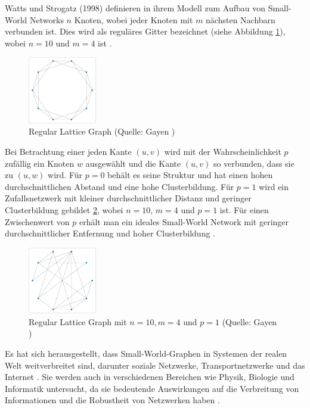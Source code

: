 Watts und Strogatz (1998) definieren in ihrem Modell zum Aufbau von Small-World Networks $n$ Knoten, wobei jeder Knoten mit $m$ nächsten Nachbarn verbunden ist.
Dies wird als reguläres Gitter bezeichnet (siehe Abbildung \ref{fig:small_world}), wobei $n = 10$ und $m = 4$ ist  \cite{gayen_small_2020}.
\begin{figure}[H]
    \centering
    \includegraphics[width=3cm]{images/20_material_methods/small_world_lattice.png}
    \caption{Regular Lattice Graph (Quelle: Gayen \cite{gayen_small_2020})}
    \label{fig:small_world}
\end{figure}
Bei Betrachtung einer jeden Kante $(u, v)$ wird mit der Wahrscheinlichkeit $p$ zufällig ein Knoten $w$ ausgewählt und die Kante $(u, v)$ so verbunden, dass sie zu $(u, w)$ wird.
Für $p = 0$ behält es seine Struktur und hat einen hohen durchschnittlichen Abstand und eine hohe Clusterbildung.
Für $p = 1$ wird ein Zufallsnetzwerk mit kleiner durchschnittlicher Distanz und geringer Clusterbildung gebildet \ref{fig:small_world_lattice_n10}, wobei $n = 10$, $m = 4$ und $p = 1$ ist.
Für einen Zwischenwert von $p$ erhält man ein ideales Small-World Network mit geringer durchschnittlicher Entfernung und hoher Clusterbildung \cite{gayen_small_2020}.
\begin{figure}[H]
    \centering
    \includegraphics[width=3cm]{images/20_material_methods/small_world_lattice_n10.png}
    \caption{Regular Lattice Graph mit $n = 10, m = 4$ und $p = 1 $ (Quelle: Gayen \cite{gayen_small_2020})}
    \label{fig:small_world_lattice_n10}
\end{figure}
Es hat sich herausgestellt, dass Small-World-Graphen in Systemen der realen Welt weitverbreitet sind, darunter soziale Netzwerke, Transportnetzwerke und das Internet \cite[p.~4]{barabasi_emergence_1999}.
Sie werden auch in verschiedenen Bereichen wie Physik, Biologie und Informatik untersucht, da sie bedeutende Auswirkungen auf die Verbreitung von Informationen und die Robustheit von Netzwerken haben \cite[p.~2]{newman_structure_2003}.

